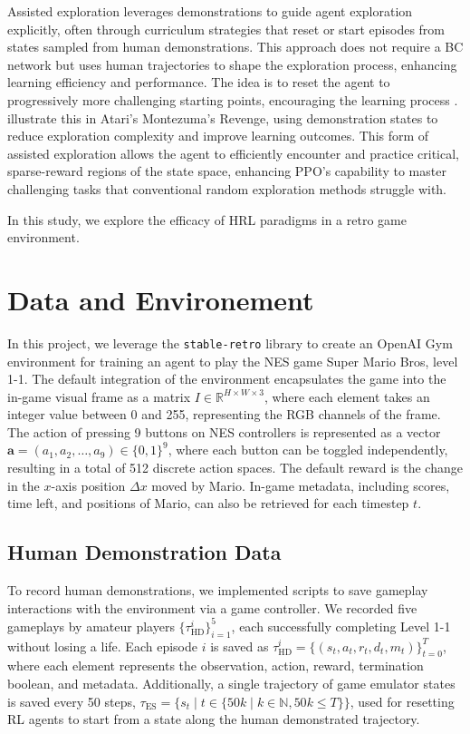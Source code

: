 \documentclass{article}
\begin{document}
Assisted exploration leverages demonstrations to guide agent exploration 
explicitly, often through curriculum strategies that reset or start episodes 
from states sampled from human demonstrations. This approach does not require 
a BC network but uses human trajectories to shape the exploration process, 
enhancing learning efficiency and performance.
The idea is to reset the agent 
to progressively more challenging starting points, encouraging the learning 
process \cite{florensa2018reversecurriculumgenerationreinforcement}. 
\cite{salimans2018learningmontezumasrevengesingle} illustrate this in Atari's 
Montezuma’s Revenge, using demonstration states to reduce exploration 
complexity and improve learning outcomes. This form of assisted exploration 
allows the agent to efficiently encounter and practice critical, sparse-reward 
regions of the state space, enhancing PPO's capability to master challenging 
tasks that conventional random exploration methods struggle with.

In this study, we explore the efficacy of HRL paradigms in a retro game 
environment.


\section{Data and Environement}
In this project, we leverage the \texttt{stable-retro} library to create an OpenAI Gym 
environment for training an agent to play the NES game Super Mario Bros, level 1-1. The 
default integration of the environment encapsulates the game into the in-game visual 
frame as a matrix $I \in \mathbb{R}^{H \times W \times 3}$, where each element takes an 
integer value between 0 and 255, representing the RGB channels of the frame. The action 
of pressing 9 buttons on NES controllers is represented as a vector 
$\mathbf{a} = (a_1, a_2, \dots, a_9) \in \{0, 1\}^9$, where each button can be toggled 
independently, resulting in a total of 512 discrete action spaces. The default reward 
is the change in the $x$-axis position $\Delta x$ moved by Mario. In-game metadata, including 
scores, time left, and positions of Mario, can also be retrieved for each timestep $t$.

\subsection{Human Demonstration Data}
\label{sec:hd_data}
To record human demonstrations, we implemented scripts to save gameplay 
interactions with the environment via a game controller. 
We recorded five gameplays by amateur players $\{\tau_{\text{HD}}^{i}\}_{i=1}^{5}$, 
each successfully completing Level 1-1 without losing a life.
Each episode $i$ is 
saved as $\tau_{\text{HD}}^{i} = \{(s_t, a_t, r_t, d_t, m_t)\}_{t=0}^{T}$, where each 
element represents the observation, action, reward, termination boolean, and 
metadata.  
Additionally, a single trajectory 
of game emulator states is saved every 50 steps, 
$\tau_{\text{ES}} = \{ s_t \mid t \in \{ 50k \mid k\in \mathbb{N}, 50k \leq T \} \}$,
used for resetting RL agents 
to start from a state along the human demonstrated trajectory.
\end{document}
